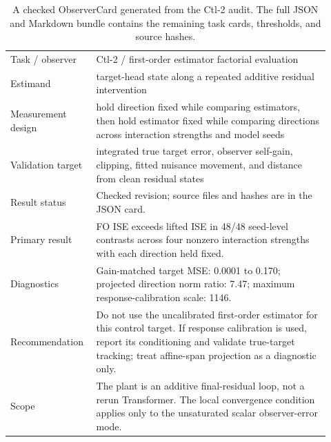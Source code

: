 \begin{table}[t]
\centering
\footnotesize
\begin{tabular}{@{}p{0.22\linewidth}p{0.70\linewidth}@{}}
\toprule
Task / observer & Ctl-2 / first-order estimator factorial evaluation \\
Estimand & target-head state along a repeated additive residual intervention \\
Measurement design & hold direction fixed while comparing estimators, then hold estimator fixed while comparing directions across interaction strengths and model seeds \\
Validation target & integrated true target error, observer self-gain, clipping, fitted nuisance movement, and distance from clean residual states \\
Result status & Checked revision; source files and hashes are in the JSON card. \\
Primary result & FO ISE exceeds lifted ISE in 48/48 seed-level contrasts across four nonzero interaction strengths with each direction held fixed. \\
Diagnostics & Gain-matched target MSE: 0.0001 to 0.170; projected direction norm ratio: 7.47; maximum response-calibration scale: 1146. \\
Recommendation & Do not use the uncalibrated first-order estimator for this control target. If response calibration is used, report its conditioning and validate true-target tracking; treat affine-span projection as a diagnostic only. \\
Scope & The plant is an additive final-residual loop, not a rerun Transformer. The local convergence condition applies only to the unsaturated scalar observer-error mode. \\
\bottomrule
\end{tabular}
\caption{A checked ObserverCard generated from the Ctl-2 audit. The full JSON and Markdown bundle contains the remaining task cards, thresholds, and source hashes.}
\label{tab:observercard}
\end{table}
